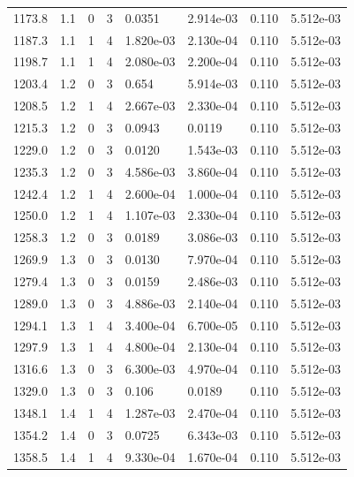 \documentclass[preview]{standalone}
\begin{document}
{{{{{\begin{tabular}{L{1.2cm}C{1.2cm} C{0.3cm}C{0.5cm} C{1.4cm}C{1.4cm} C{1.4cm}C{1.4cm}}
  1173.8  &   1.1  & 0     &  3 &  0.0351  & 2.914e-03  & 0.110 &  5.512e-03   \\ 
  1187.3  &   1.1  & 1     &  4 &  1.820e-03  & 2.130e-04  & 0.110 &  5.512e-03   \\ 
  1198.7  &   1.1  & 1     &  4 &  2.080e-03  & 2.200e-04  & 0.110 &  5.512e-03   \\ 
  1203.4  &   1.2  & 0     &  3 &  0.654  & 5.914e-03  & 0.110 &  5.512e-03   \\ 
  1208.5  &   1.2  & 1     &  4 &  2.667e-03  & 2.330e-04  & 0.110 &  5.512e-03   \\ 
  1215.3  &   1.2  & 0     &  3 &  0.0943  & 0.0119  & 0.110 &  5.512e-03   \\ 
  1229.0  &   1.2  & 0     &  3 &  0.0120  & 1.543e-03  & 0.110 &  5.512e-03   \\ 
  1235.3  &   1.2  & 0     &  3 &  4.586e-03  & 3.860e-04  & 0.110 &  5.512e-03   \\ 
  1242.4  &   1.2  & 1     &  4 &  2.600e-04  & 1.000e-04  & 0.110 &  5.512e-03   \\ 
  1250.0  &   1.2  & 1     &  4 &  1.107e-03  & 2.330e-04  & 0.110 &  5.512e-03   \\ 
  1258.3  &   1.2  & 0     &  3 &  0.0189  & 3.086e-03  & 0.110 &  5.512e-03   \\ 
  1269.9  &   1.3  & 0     &  3 &  0.0130  & 7.970e-04  & 0.110 &  5.512e-03   \\ 
  1279.4  &   1.3  & 0     &  3 &  0.0159  & 2.486e-03  & 0.110 &  5.512e-03   \\ 
  1289.0  &   1.3  & 0     &  3 &  4.886e-03  & 2.140e-04  & 0.110 &  5.512e-03   \\ 
  1294.1  &   1.3  & 1     &  4 &  3.400e-04  & 6.700e-05  & 0.110 &  5.512e-03   \\ 
  1297.9  &   1.3  & 1     &  4 &  4.800e-04  & 2.130e-04  & 0.110 &  5.512e-03   \\ 
  1316.6  &   1.3  & 0     &  3 &  6.300e-03  & 4.970e-04  & 0.110 &  5.512e-03   \\ 
  1329.0  &   1.3  & 0     &  3 &  0.106  & 0.0189  & 0.110 &  5.512e-03   \\ 
  1348.1  &   1.4  & 1     &  4 &  1.287e-03  & 2.470e-04  & 0.110 &  5.512e-03   \\ 
  1354.2  &   1.4  & 0     &  3 &  0.0725  & 6.343e-03  & 0.110 &  5.512e-03   \\ 
  1358.5  &   1.4  & 1     &  4 &  9.330e-04  & 1.670e-04  & 0.110 &  5.512e-03   \\ 

\end{tabular}}}}}}
\end{document}
